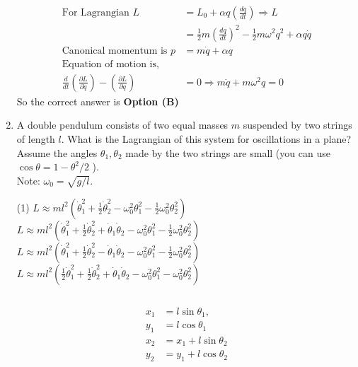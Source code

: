 \begin{enumerate}
\begin{answer}
\begin{align*}
	\text{For Lagrangian }L&=L_{0}+\alpha q\left(\frac{d q}{d t}\right) \Rightarrow L\\&=\frac{1}{2} m\left(\frac{d q}{d t}\right)^{2}-\frac{1}{2} m \omega^{2} q^{2}+\alpha q \dot{q}\\
	\text{Canonical momentum is }p&=m \dot{q}+\alpha q\\
	\text{Equation of motion is,}\\
	\frac{d}{d t}\left(\frac{\partial L}{\partial \dot{q}}\right)-\left(\frac{\partial L}{\partial q}\right)&=0 \Rightarrow m \ddot{q}+m \omega^{2} q=0
	\end{align*}
	So the correct answer is \textbf{Option (B)}
\end{answer}
	\item  A double pendulum consists of two equal masses $m$ suspended by two strings of length $l$. What is the Lagrangian of this system for oscillations in a plane? Assume the angles $\theta_{1}, \theta_{2}$ made by the two strings are small (you can use $\cos \theta=1-\theta^{2} / 2$ ).\\
	Note: $\omega_{0}=\sqrt{g / l}$.
	{}
	\begin{tasks}(1)
		\task[\textbf{A.}] $L \approx m l^{2}\left(\dot{\theta}_{1}^{2}+\frac{1}{2} \dot{\theta}_{2}^{2}-\omega_{0}^{2} \theta_{1}^{2}-\frac{1}{2} \omega_{0}^{2} \theta_{2}^{2}\right)$
		\task[\textbf{B.}]  $L \approx m l^{2}\left(\dot{\theta}_{1}^{2}+\frac{1}{2} \dot{\theta}_{2}^{2}+\dot{\theta}_{1} \dot{\theta}_{2}-\omega_{0}^{2} \theta_{1}^{2}-\frac{1}{2} \omega_{0}^{2} \theta_{2}^{2}\right)$
		\task[\textbf{C.}] $L \approx m l^{2}\left(\dot{\theta}_{1}^{2}+\frac{1}{2} \dot{\theta}_{2}^{2}-\dot{\theta}_{1} \dot{\theta}_{2}-\omega_{0}^{2} \theta_{1}^{2}-\frac{1}{2} \omega_{0}^{2} \theta_{2}^{2}\right)$
		\task[\textbf{D.}]  $L \approx m l^{2}\left(\frac{1}{2} \dot{\theta}_{1}^{2}+\frac{1}{2} \dot{\theta}_{2}^{2}+\dot{\theta}_{1} \dot{\theta}_{2}-\omega_{0}^{2} \theta_{1}^{2}-\omega_{0}^{2} \theta_{2}^{2}\right)$
	\end{tasks}
\begin{answer}$\left. \right. $\\
	\begin{minipage}{0.45\textwidth}
		\begin{align*}
		x_{1}&=l \sin \theta_{1},\\ y_{1}&=l \cos \theta_{1}\\
		x_{2}&=x_{1}+l \sin \theta_{2}\\y_{2}&=y_{1}+l \cos \theta_{2}\\

\end{align*}
\end{minipage}
\end{answer}
\end{enumerate}
